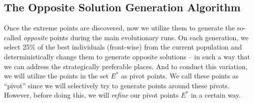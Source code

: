 \documentclass[journal]{IEEEtran}
\begin{document}
\subsection{The Opposite Solution Generation Algorithm}
\label{sec:generate-pivot-points}
Once the extreme points are discovered, now we utilize them to generate the so-called \textit{opposite} points during the main evolutionary runs. On each generation, we select 25\% of the best individuals (front-wise) from the current population and deterministically change them to generate opposite solutions -- in such a way that we can address the strategically preferable places. And to conduct this variation, we will utilize the points in the set \(E^\ast\) as pivot points. We call these points as ``pivot'' since we will selectively try to generate points around these pivots. However, before doing this, we will \textit{refine} our pivot points \(E^\ast\) in a certain way. 
\end{document}
